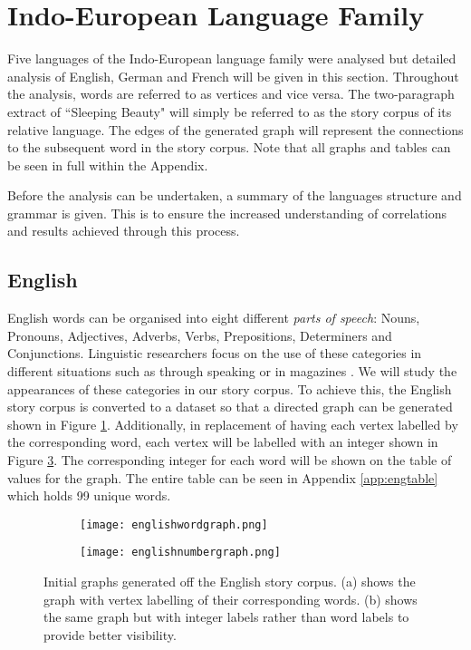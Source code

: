 \section{Indo-European Language Family}
Five languages of the Indo-European language family were analysed but detailed analysis of English, German and French will be given in this section. Throughout the analysis, words are referred to as vertices and vice versa. The two-paragraph extract of ``Sleeping Beauty" will simply be referred to as the story corpus of its relative language. The edges of the generated graph will represent the connections to the subsequent word in the story corpus. Note that all graphs and tables can be seen in full within the Appendix.

Before the analysis can be undertaken, a summary of the languages structure and grammar is given. This is to ensure the increased understanding of correlations and results achieved through this process.

\subsection{English}
English words can be organised into eight different \emph{parts of speech}: Nouns, Pronouns, Adjectives, Adverbs, Verbs, Prepositions, Determiners and Conjunctions. Linguistic researchers focus on the use of these categories in different situations such as through speaking or in magazines \cite{khaisaeng2017study}. We will study the appearances of these categories in our story corpus. To achieve this, the English story corpus is converted to a dataset so that a directed graph can be generated shown in Figure \ref{fig:engword}. Additionally, in replacement of having each vertex labelled by the corresponding word, each vertex will be labelled with an integer shown in Figure \ref{fig:engnum}. The corresponding integer for each word will be shown on the table of values for the graph. The entire table can be seen in Appendix \ref{app:engtable} which holds 99 unique words.

\begin{figure}[!htb]
\centering
\begin{subfigure}{.45\textwidth}
	\texttt{[image: englishwordgraph.png]}
	\caption{}
	\label{fig:engword}
\end{subfigure}
\hfill
\begin{subfigure}{.45\textwidth}
	\texttt{[image: englishnumbergraph.png]}
	\caption{}
	\label{fig:engnum}
\end{subfigure}
\caption{Initial graphs generated off the English story corpus. (a) shows the graph with vertex labelling of their corresponding words. (b) shows the same graph but with integer labels rather than word labels to provide better visibility.}
\end{figure}


